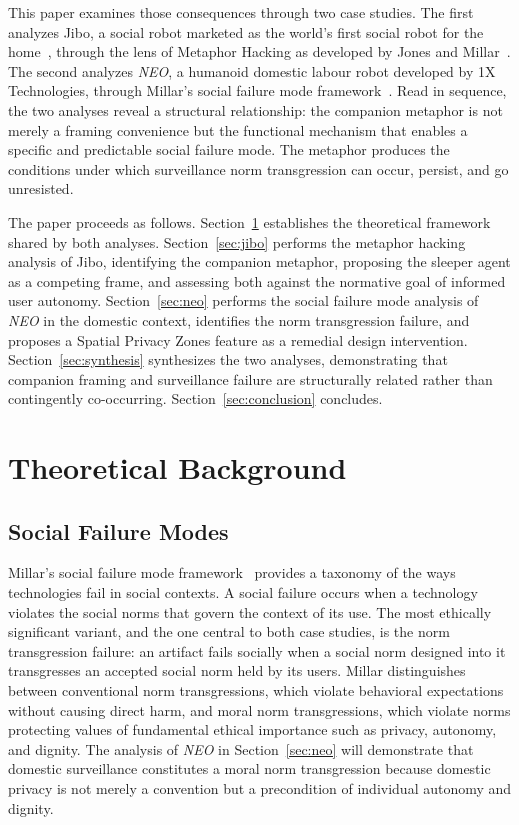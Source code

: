 \documentclass{ieee-portfolio}
\newcommand{\neo}{\textit{NEO}}
\begin{document}
This paper examines those consequences through two case studies. The first analyzes Jibo, a social robot marketed as the world's first social robot for the home~\cite{breazeal_jibo_2014}, through the lens of Metaphor Hacking as developed by Jones and Millar~\cite{jones_hacking_2017}. The second analyzes \neo{}, a humanoid domestic labour robot developed by 1X Technologies, through Millar's social failure mode framework~\cite{millar_social_2020}. Read in sequence, the two analyses reveal a structural relationship: the companion metaphor is not merely a framing convenience but the functional mechanism that enables a specific and predictable social failure mode. The metaphor produces the conditions under which surveillance norm transgression can occur, persist, and go unresisted.

The paper proceeds as follows. Section~\ref{sec:background} establishes the theoretical framework shared by both analyses. Section~\ref{sec:jibo} performs the metaphor hacking analysis of Jibo, identifying the companion metaphor, proposing the sleeper agent as a competing frame, and assessing both against the normative goal of informed user autonomy. Section~\ref{sec:neo} performs the social failure mode analysis of \neo{} in the domestic context, identifies the norm transgression failure, and proposes a Spatial Privacy Zones feature as a remedial design intervention. Section~\ref{sec:synthesis} synthesizes the two analyses, demonstrating that companion framing and surveillance failure are structurally related rather than contingently co-occurring. Section~\ref{sec:conclusion} concludes.

\section{Theoretical Background}
\label{sec:background}

\subsection{Social Failure Modes}

Millar's social failure mode framework~\cite{millar_social_2020} provides a taxonomy of the ways technologies fail in social contexts. A social failure occurs when a technology violates the social norms that govern the context of its use. The most ethically significant variant, and the one central to both case studies, is the norm transgression failure: an artifact fails socially when a social norm designed into it transgresses an accepted social norm held by its users. Millar distinguishes between conventional norm transgressions, which violate behavioral expectations without causing direct harm, and moral norm transgressions, which violate norms protecting values of fundamental ethical importance such as privacy, autonomy, and dignity. The analysis of \neo{} in Section~\ref{sec:neo} will demonstrate that domestic surveillance constitutes a moral norm transgression because domestic privacy is not merely a convention but a precondition of individual autonomy and dignity.
\end{document}
